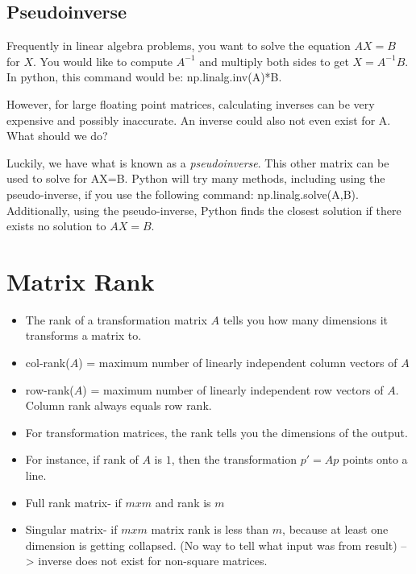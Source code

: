 \documentclass{article}
\begin{document}
\subsection{Pseudoinverse}

Frequently in linear algebra problems, you want to solve the equation $AX=B$ for $X$. You would like to compute $A^{-1}$ and multiply both sides to get $X=A^{-1}B$. In python, this command would be: np.linalg.inv(A)*B.

However, for large floating point matrices, calculating inverses can be very expensive and possibly inaccurate. An inverse could also not even exist for A. What should we do?

Luckily, we have what is known as a \textit{pseudoinverse}. This other matrix can be used to solve for AX=B. Python will try many methods, including using the pseudo-inverse, if you use the following command: np.linalg.solve(A,B). Additionally, using the pseudo-inverse, Python finds the closest solution if there exists no solution to $AX=B$.

\section{Matrix Rank}
\begin{itemize}
\item The rank of a transformation matrix  $A$ tells you how many dimensions it transforms a matrix to.

\item col-rank($A$) = maximum number of linearly independent column vectors of $A$

\item row-rank($A$) = maximum number of linearly independent row vectors of $A$.
Column rank always equals row rank.

\item For transformation matrices, the rank tells you the dimensions of the output.

\item For instance, if rank of $A$ is $1$, then the transformation $p' =Ap$ points onto a line.

\item Full rank matrix- if $mxm$ and rank is $m$

\item Singular matrix- if $mxm$ matrix rank is less than $m$, because at least one dimension is getting collapsed. (No way to tell what input was from result) --> inverse does not exist for non-square matrices.
\end{itemize}
\end{document}
